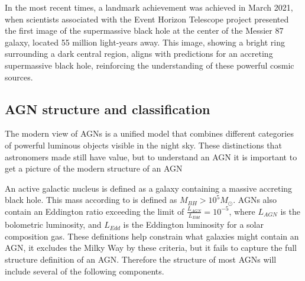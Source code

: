 \documentclass{article}
\begin{document}
In the most recent times, a landmark achievement was achieved in March 2021, when scientists associated with the Event Horizon Telescope project 
presented the first image of the supermassive black hole at the center of the Messier 87 galaxy, located 55 million light-years away.
This image, showing a bright ring surrounding a dark central region, aligns with predictions for an accreting supermassive black hole, 
reinforcing the understanding of these powerful cosmic sources.



\subsection{AGN structure and classification}


The modern view of AGNs is a unified model that combines different categories of powerful luminous objects visible in the night sky.
These distinctions that astronomers made still
have value, but to understand an AGN it is important to get a picture of the modern structure of an AGN

An active galactic nucleus is defined as a galaxy containing a massive accreting black hole. This mass according to \cite{Netzer_2015} 
is defined as $M_{BH} > 10^5 M_\odot$. AGNs also contain an Eddington ratio exceeding
the limit of $\frac{L_{AGN}}{L_{Edd}} = 10^{-5}$, where $L_{AGN}$ is the bolometric luminosity, and $L_{Edd}$ is the Eddington luminosity for a solar 
composition gas. These definitions help constrain what galaxies might contain an AGN, it excludes the Milky Way 
by these criteria, but it fails to capture the full structure definition of an AGN. 
Therefore the structure of most AGNs will include several of the following components. 
\end{document}

